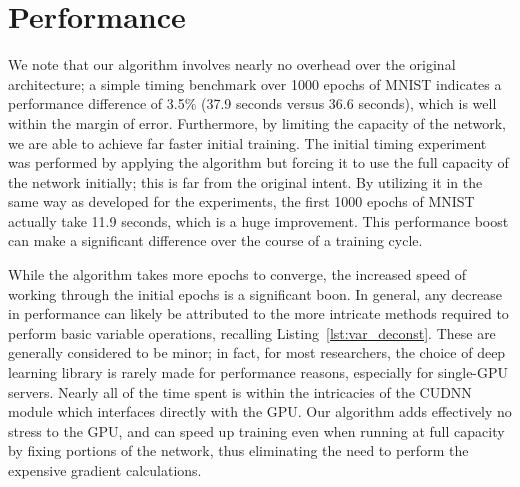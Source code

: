 \section{Performance}
We note that our algorithm involves nearly no overhead over the original architecture; a simple timing benchmark over 1000 epochs of MNIST indicates a performance difference of 3.5\% (37.9 seconds versus 36.6 seconds), which is well within the margin of error.
Furthermore, by limiting the capacity of the network, we are able to achieve far faster initial training.
The initial timing experiment was performed by applying the algorithm but forcing it to use the full capacity of the network initially; this is far from the original intent.
By utilizing it in the same way as developed for the experiments, the first 1000 epochs of MNIST actually take 11.9 seconds, which is a huge improvement.
This performance boost can make a significant difference over the course of a training cycle.

While the algorithm takes more epochs to converge, the increased speed of working through the initial epochs is a significant boon.
In general, any decrease in performance can likely be attributed to the more intricate methods required to perform basic variable operations, recalling Listing~\ref{lst:var_deconst}.
These are generally considered to be minor; in fact, for most researchers, the choice of deep learning library is rarely made for performance reasons, especially for single-GPU servers.
Nearly all of the time spent is within the intricacies of the CUDNN module which interfaces directly with the GPU.
Our algorithm adds effectively no stress to the GPU, and can speed up training even when running at full capacity by fixing portions of the network, thus eliminating the need to perform the expensive gradient calculations.
